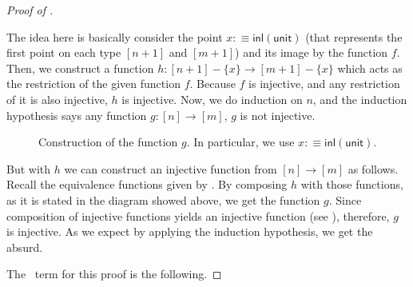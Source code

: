 \documentclass[11pt, a4paper, oneside]{amsart}
\begin{document}
\begin{proof}[Proof of ]\label{proof-pigeon-theorem}

The idea here is basically consider the point $x :\equiv \mathsf{inl}
(\mathsf{unit})$ (that represents the first point on each type $[n+1]$ and
$[m+1]$) and its image by the function $f$. Then, we construct a function $h :
[n + 1] - \{x\} \to [ m + 1 ] - \{ x\}$ which acts as the restriction of the
given function $f$. Because $f$ is injective, and any restriction of it is
also injective, $h$ is injective. Now, we do induction on $n$, and the
induction hypothesis says any function $g : [n] → [m]$, $g$ is not injective.

\begin{figure}[!ht]
\begin{center}
\end{center}
\caption{Construction of the function $g$. In particular, we use $x :\equiv \mathsf{inl}(\mathsf{unit})$. }
\label{diagram}
\end{figure}

But with $h$ we can construct an injective function from $[n] \to [m]$ as
follows. Recall the equivalence functions given by . By
composing $h$ with those functions, as it is stated in the diagram showed
above, we get the function $g$. Since composition of injective functions
yields an injective function (see ),
therefore, $g$ is injective. As we expect by applying the induction
hypothesis, we get the absurd.

The \Agda\ term for this proof is the following.


\end{proof}
\end{document}
